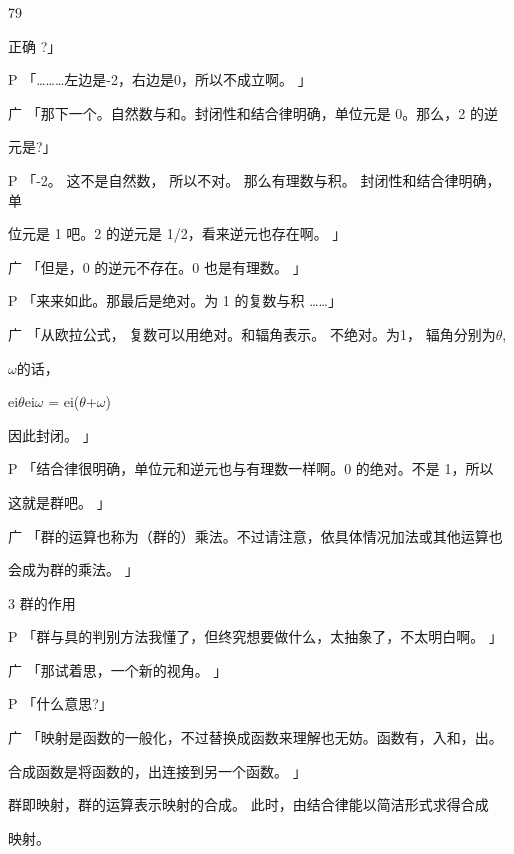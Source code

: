 79\par
正确 ?」\par
P 「………左边是-2，右边是0，所以不成立啊。 」\par
广 「那下一个。自然数与和。封闭性和结合律明确，单位元是 0。那么，2 的逆\par
元是?」\par
P 「-2。 这不是自然数， 所以不对。 那么有理数与积。 封闭性和结合律明确， 单\par
位元是 1 吧。2 的逆元是 1/2，看来逆元也存在啊。 」\par
广 「但是，0 的逆元不存在。0 也是有理数。 」\par
P 「来来如此。那最后是绝对。为 1 的复数与积 ……」\par
广 「从欧拉公式， 复数可以用绝对。和辐角表示。 不绝对。为1， 辐角分别为$\theta$,\par
$\omega$的话，\par
ei$\theta$ei$\omega$ = ei($\theta$+$\omega$)\par
因此封闭。 」\par
P 「结合律很明确，单位元和逆元也与有理数一样啊。0 的绝对。不是 1，所以\par
这就是群吧。 」\par
广 「群的运算也称为（群的）乘法。不过请注意，依具体情况加法或其他运算也\par
会成为群的乘法。 」\par
3 群的作用\par
P 「群与具的判别方法我懂了，但终究想要做什么，太抽象了，不太明白啊。 」\par
广 「那试着思，一个新的视角。 」\par
P 「什么意思?」\par
广 「映射是函数的一般化，不过替换成函数来理解也无妨。函数有，入和，出。\par
合成函数是将函数的，出连接到另一个函数。 」\par
群即映射，群的运算表示映射的合成。 此时，由结合律能以简洁形式求得合成\par
映射。\par

